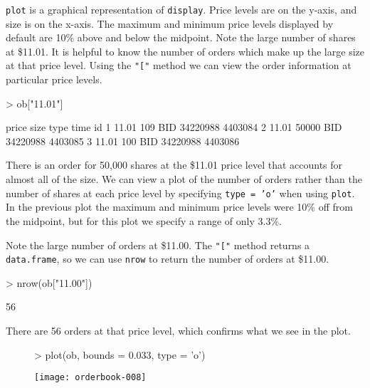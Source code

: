 \documentclass[a4paper]{report}
\begin{document}
\begin{article}
\texttt{plot} is a graphical representation of \texttt{display}. Price
levels are on the y-axis, and size is on the x-axis. The maximum and
minimum price levels displayed by default are 10\% above and below the
midpoint. Note the large number of shares at \$11.01. It is helpful to
know the number of orders which make up the large size at that price
level. Using the \texttt{"["} method we can view the order information
at particular price levels.

\begin{Schunk}
\begin{Sinput}
> ob["11.01"]
\end{Sinput}
\begin{Soutput}
  price  size type     time      id
1 11.01   109  BID 34220988 4403084
2 11.01 50000  BID 34220988 4403085
3 11.01   100  BID 34220988 4403086
\end{Soutput}
\end{Schunk}

There is an order for 50,000 shares at the \$11.01 price level that
accounts for almost all of the size.  We can view a plot of the number
of orders rather than the number of shares at each price level by
specifying \texttt{type = 'o'} when using \texttt{plot}. In the
previous plot the maximum and minimum price levels were 10\% off from
the midpoint, but for this plot we specify a range of only 3.3\%.

Note the large number of orders at \$11.00. The \texttt{"["} method
returns a \texttt{data.frame}, so we can use \texttt{nrow} to return
the number of orders at \$11.00.

\begin{Schunk}
\begin{Sinput}
> nrow(ob["11.00"])
\end{Sinput}
\begin{Soutput}
[1] 56
\end{Soutput}
\end{Schunk}

There are 56 orders at that price level, which confirms what
we see in the plot.

\begin{figure}
\centering
\vspace*{.1in}
\begin{Schunk}
\begin{Sinput}
> plot(ob, bounds = 0.033, type = 'o')
\end{Sinput}
\end{Schunk}
\texttt{[image: orderbook-008]}
\end{figure}


\end{article}
\end{document}
